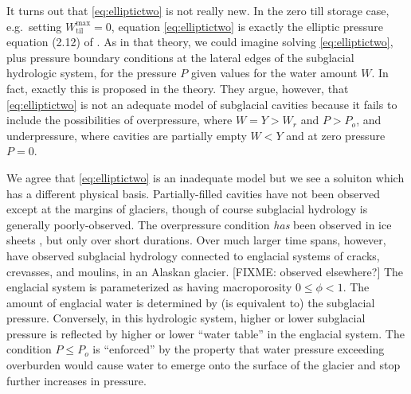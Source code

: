 \documentclass[11pt,final]{amsart}
\newcommand{\Wtilmax}{W_{\text{til}}^{\text{max}}}
\begin{document}
It turns out that \eqref{eq:elliptictwo} is not really new.  In the zero till storage case, e.g.~setting $\Wtilmax=0$, equation \eqref{eq:elliptictwo} is exactly the elliptic pressure equation (2.12) of \cite{Schoofetal2012}.  As in that theory, we could imagine solving \eqref{eq:elliptictwo}, plus pressure boundary conditions at the lateral edges of the subglacial hydrologic system, for the pressure $P$ given values for the water amount $W$.  In fact, exactly this is proposed in the \cite{Schoofetal2012} theory.  They argue, however, that \eqref{eq:elliptictwo} is not an adequate model of subglacial cavities because it fails to include the possibilities of overpressure, where $W=Y>W_r$ and $P>P_o$, and underpressure, where cavities are partially empty $W<Y$ and at zero pressure $P=0$.

We agree that \eqref{eq:elliptictwo} is an inadequate model but we see a soluiton which has a different physical basis.  Partially-filled cavities have not been observed except at the margins of glaciers, though of course subglacial hydrology is generally poorly-observed.  The overpressure condition \emph{has} been observed in ice sheets \citep{Dasetal08}, but only over short durations.  Over much larger time spans, however, \cite{Bartholomausetal2008,Bartholomausetal2011} have observed subglacial hydrology connected to englacial systems of cracks, crevasses, and moulins, in an Alaskan glacier.  [FIXME: observed elsewhere?]  The englacial system is parameterized as having macroporosity $0\le \phi < 1$.  The amount of englacial water is determined by (is equivalent to) the subglacial pressure.  Conversely, in this hydrologic system, higher or lower subglacial pressure is reflected by higher or lower ``water table'' in the englacial system.  The condition $P\le P_o$ is ``enforced'' by the property that water pressure exceeding overburden would cause water to emerge onto the surface of the glacier and stop further increases in pressure.
\end{document}
